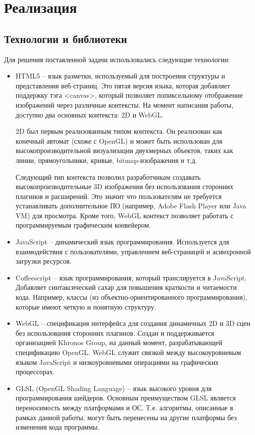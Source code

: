 \newpage
\section{Реализация} 

\subsection{Технологии и библиотеки} 

Для решения поставленной задачи использовались следующие технологии:

\begin{itemize} 
  \item HTML5 -- язык разметки, используемый для построения структуры и представления веб-страниц. 
    Это пятая версия языка, которая добавляет поддержку тэга \textless{}canvas\textgreater{}, 
    который позволяет попиксельному отображение изображений через различные контексты. 
    На момент написания работы, доступно два основных контекста: 2D и WebGL.

    2D был первым реализованным типом контекста. Он реализован как конечный автомат (схоже 
    с OpenGL) и может быть использован для высокопроизводительной визуализации двухмерных объектов, 
    таких как линии, прямоугольники, кривые, bitmap-изображения и т.д.

    Следующий тип контекста позволил разработчикам создавать высокопроизводительные 3D изображения 
    без использования сторонних плагинов и расширений. Это значит что пользователям не требуется 
    устанавливать дополнительное ПО (например, Adobe Flash Player или Java VM) для просмотра. 
    Кроме того, WebGL контекст позволяет работать с программируемым графическим конвейером. 

  \item JavaScript -- динамический язык программирования. Используется для взаимодействия с 
    пользователями, управлением веб-страницей и асинхронной загрузки ресурсов.

  \item Coffeescript -- язык программирования, который транслируется в JavaScript. Добавляет 
    синтаксический сахар для повышения краткости и читаемости кода. Например, классы 
    (из объектно-ориентированного программирования), которые имеют четкую и понятную структуру.

  \item WebGL -- спецификация интерфейса для создания динамичных 2D и 3D сцен без использования 
    сторонних плагинов. Создан и поддерживается организацией Khronos Group, на данный момент, 
    разрабатывающей спецификацию OpenGL. WebGL служит связкой между высокоуровневым языком 
    JavaScript и низкоуровневыми операциями на графических процессорах.

  \item GLSL (OpenGL Shading Language) -- язык высокого уровня для программирования шейдеров. 
    Основным преимуществом GLSL является переносимость между платформами и ОС. Т.е. алгоритмы, 
    описанные в рамках данной работы, могут быть перенесены на другие платформы без изменения 
    кода программы.
\end{itemize}

